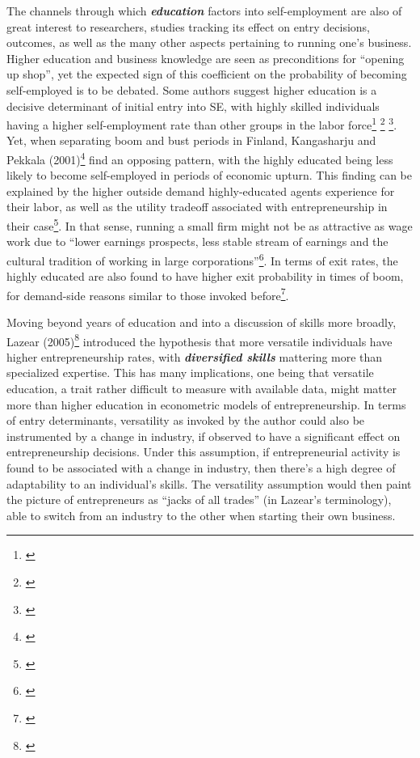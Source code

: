 The channels through which \textbf{\textit{education}} factors into self-employment are also of great interest to researchers, studies tracking its effect on entry decisions, outcomes, as well as the many other aspects pertaining to running one’s business. Higher education and business knowledge are seen as preconditions for ``opening up shop'', yet the expected sign of this coefficient on the probability of becoming self-employed is to be debated. Some authors suggest higher education is a decisive determinant of initial entry into SE, with highly skilled individuals having a higher self-employment rate than other groups in the labor force\footnote{\cite{rees1986empirical}}\hspace{.15em} \footnote{\cite{robinson1994effect}}\hspace{.15em} \footnote{\cite{luber2000growing}}. Yet, when separating boom and bust periods in Finland, Kangasharju and Pekkala (2001)\footnote{\cite{kangasharju2001regional}} find an opposing pattern, with the highly educated being less likely to become self-employed in periods of economic upturn. This finding can be explained by the higher outside demand highly-educated agents experience for their labor, as well as the utility tradeoff associated with entrepreneurship in their case\footnote{\cite{kangasharju2001regional}}. In that sense, running a small firm might not be as attractive as wage work due to ``lower earnings prospects, less stable stream of earnings and the cultural tradition of working in large corporations''\footnote{\cite{kangasharju2001regional}}. In terms of exit rates, the highly educated are also found to have higher exit probability in times of boom, for demand-side reasons similar to those invoked before\footnote{\cite{kangasharju2001regional}}.

Moving beyond years of education and into a discussion of skills more broadly, Lazear (2005)\footnote{\cite{Lazear2005}} introduced the hypothesis that more versatile individuals have higher entrepreneurship rates, with \textbf{\textit{diversified skills}} mattering more than specialized expertise. This has many implications, one being that versatile education, a trait rather difficult to measure with available data, might matter more than higher education in econometric models of entrepreneurship. In terms of entry determinants, versatility as invoked by the author could also be instrumented by a change in industry, if observed to have a significant effect on entrepreneurship decisions. Under this assumption, if entrepreneurial activity is found to be associated with a change in industry, then there’s a high degree of adaptability to an individual’s skills. The versatility assumption would then paint the picture of entrepreneurs as ``jacks of all trades'' (in Lazear's terminology), able to switch from an industry to the other when starting their own business.

